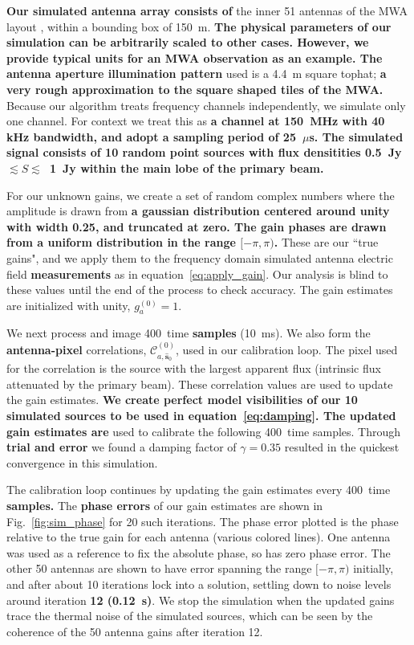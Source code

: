 \documentclass[a4paper,fleqn,usenatbib]{../mnras}
\newcommand{\spix}{\ensuremath{\hat{\mathbf{s}}_{0}}}
\newcommand{\Cna}[1][n]{\ensuremath{\mathcal{C}^{(#1)}_{a,\spix}}}
\newcommand{\caliter}{400}
\newcommand{\damp}{\ensuremath{\gamma}}
\begin{document}
\textbf{Our simulated antenna 
array consists of} the inner 51 antennas of the MWA layout \citep{bea12}, within a bounding 
box of 150~m. 
\textbf{The physical parameters of our simulation can be arbitrarily scaled to other cases. However, 
we provide typical units for an MWA observation as an example. 
The antenna aperture illumination pattern} used is a 4.4~m square tophat; \textbf{a very rough 
approximation to the square shaped tiles of the MWA.} Because our algorithm treats frequency 
channels independently, we simulate only one channel. For context we treat this as \textbf{a channel
at 150~MHz with 40 kHz bandwidth, and adopt a sampling period of 25~$\mu$s. The simulated signal 
consists of 10 random point sources with flux densitities 0.5~Jy~$\lesssim S \lesssim$~1~Jy 
within the main lobe of the primary beam.}

For our unknown gains, we create a set of random complex numbers where the amplitude is 
drawn from \textbf{a gaussian distribution centered around unity with width 0.25, and truncated at zero. The gain phases are drawn from a uniform distribution in the range $[-\pi, \pi)$. }
These are our ``true gains", and we apply them to the frequency
domain simulated antenna electric field \textbf{measurements} as in equation~\ref{eq:apply_gain}. Our analysis is 
blind to these values until the end of the process to check accuracy. The gain estimates are 
initialized with unity, $g^{(0)}_a=1$.

We next process and image \caliter~time \textbf{samples} (10~ms). We also form the \textbf{antenna-pixel} correlations, 
\Cna[0], used in our calibration loop. The pixel used for the correlation is the source with the 
largest apparent flux (intrinsic flux attenuated by the primary beam). These correlation values 
are used to update the gain estimates. \textbf{We create perfect model 
visibilities of our 10 simulated sources to be used in equation~\ref{eq:damping}. 
The updated gain estimates are} used to calibrate the following 
\caliter~time samples. Through \textbf{trial and error} we found a damping factor of $\damp=0.35$ 
resulted in the quickest convergence in this simulation.

The calibration loop continues by updating the gain estimates every \caliter~time \textbf{samples.} The 
\textbf{phase errors} of our gain estimates are shown in Fig.~\ref{fig:sim_phase} for 20 such iterations. 
The phase error plotted is the phase relative to the true gain for each antenna (various colored 
lines). One antenna was used as a reference to fix the absolute phase, so has zero phase 
error. The other 50 antennas are shown to have error spanning the range $[-\pi,\pi)$ initially, and after about 
10 iterations lock into a solution, settling down to noise levels around iteration \textbf{12 (0.12~s)}. We 
stop the simulation when the updated gains trace the thermal noise of the simulated sources, 
which can be seen by the coherence of the 50 antenna gains after iteration 12.
\end{document}
